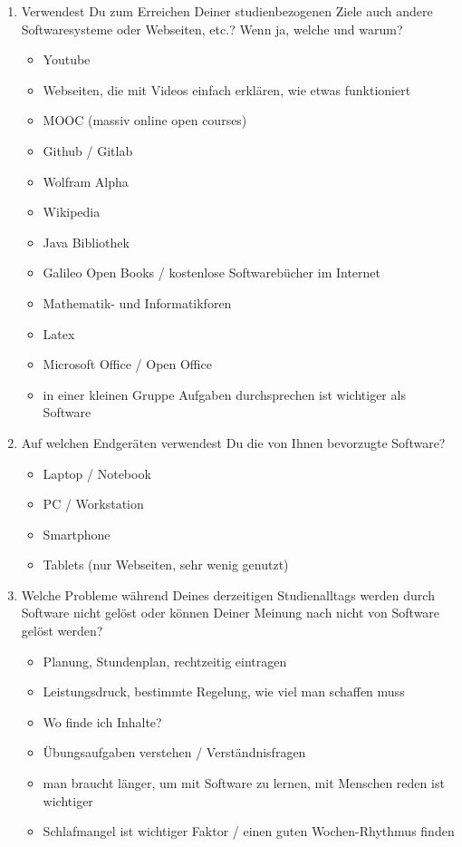 \documentclass{article}
\begin{document}
\begin{enumerate}
\item Verwendest Du zum Erreichen Deiner studienbezogenen Ziele auch andere Softwaresysteme oder Webseiten, etc.? Wenn ja, welche und warum?
\begin{itemize}
\item Youtube
\item Webseiten, die mit Videos einfach erklären, wie etwas funktioniert
\item MOOC (massiv online open courses)
\item Github / Gitlab
\item Wolfram Alpha
\item Wikipedia
\item Java Bibliothek
\item Galileo Open Books / kostenlose Softwarebücher im Internet
\item Mathematik- und Informatikforen
\item Latex
\item Microsoft Office / Open Office
\item in einer kleinen Gruppe Aufgaben durchsprechen ist wichtiger als Software
\end{itemize}

\item Auf welchen Endgeräten verwendest Du die von Ihnen bevorzugte Software?
\begin{itemize}
\item Laptop / Notebook
\item PC / Workstation
\item Smartphone
\item Tablets (nur Webseiten, sehr wenig genutzt)
\end{itemize}

\item Welche Probleme während Deines derzeitigen Studienalltags werden durch Software nicht gelöst oder können Deiner Meinung nach nicht von Software gelöst werden?
\begin{itemize}
\item Planung, Stundenplan, rechtzeitig eintragen
\item Leistungsdruck, bestimmte Regelung, wie viel man schaffen muss
\item Wo finde ich Inhalte?
\item Übungsaufgaben verstehen / Verständnisfragen
\item man braucht länger, um mit Software zu lernen, mit Menschen reden ist wichtiger
\item Schlafmangel ist wichtiger Faktor / einen guten Wochen-Rhythmus finden
\end{itemize}


\end{enumerate}
\end{document}
